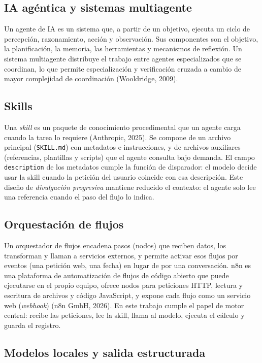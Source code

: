 \documentclass[12pt,letterpaper]{article}
\begin{document}
\subsection{IA agéntica y sistemas multiagente}

Un agente de IA es un sistema que, a partir de un objetivo, ejecuta un ciclo de percepción, razonamiento, acción y observación. Sus componentes son el objetivo, la planificación, la memoria, las herramientas y mecanismos de reflexión. Un sistema multiagente distribuye el trabajo entre agentes especializados que se coordinan, lo que permite especialización y verificación cruzada a cambio de mayor complejidad de coordinación (Wooldridge, 2009).

\subsection{Skills}

Una \emph{skill} es un paquete de conocimiento procedimental que un agente carga cuando la tarea lo requiere (Anthropic, 2025). Se compone de un archivo principal (\texttt{SKILL.md}) con metadatos e instrucciones, y de archivos auxiliares (referencias, plantillas y scripts) que el agente consulta bajo demanda. El campo \texttt{description} de los metadatos cumple la función de disparador: el modelo decide usar la skill cuando la petición del usuario coincide con esa descripción. Este diseño de \emph{divulgación progresiva} mantiene reducido el contexto: el agente solo lee una referencia cuando el paso del flujo lo indica.

\subsection{Orquestación de flujos}

Un orquestador de flujos encadena pasos (nodos) que reciben datos, los transforman y llaman a servicios externos, y permite activar esos flujos por eventos (una petición web, una fecha) en lugar de por una conversación. n8n es una plataforma de automatización de flujos de código abierto que puede ejecutarse en el propio equipo, ofrece nodos para peticiones HTTP, lectura y escritura de archivos y código JavaScript, y expone cada flujo como un servicio web (\emph{webhook}) (n8n GmbH, 2026). En este trabajo cumple el papel de motor central: recibe las peticiones, lee la skill, llama al modelo, ejecuta el cálculo y guarda el registro.

\subsection{Modelos locales y salida estructurada}
\end{document}

